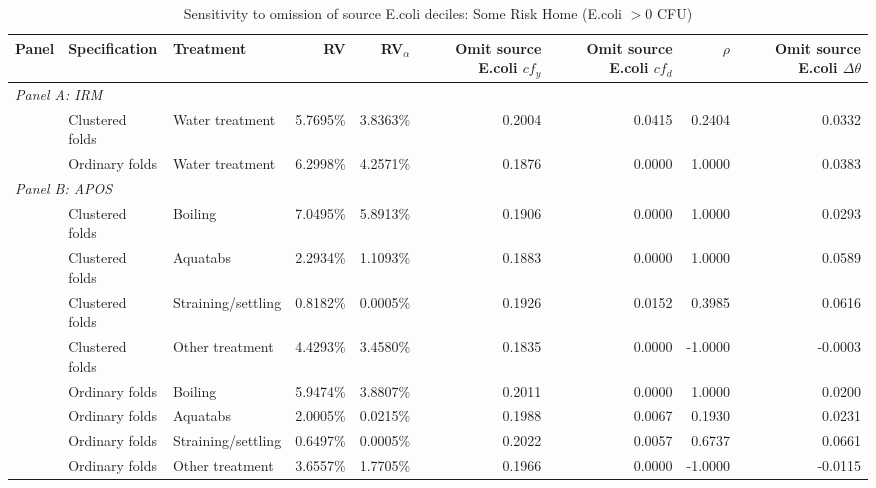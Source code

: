 \begin{landscape}
\begin{table}[p]
\centering
\caption{Sensitivity to omission of source E.coli deciles: Some Risk Home (E.coli $>0$ CFU)}
\label{tab:table_sensitivity_benchmark-SomeRiskHome}
\scriptsize
\setlength{\tabcolsep}{5pt}
\renewcommand{\arraystretch}{0.92}
\begin{adjustbox}{max width=\linewidth, center}
\begin{tabular}{lllrrrrrr}
\toprule
Panel & Specification & Treatment & RV & RV$_\alpha$ & \shortstack{Omit source E.coli\\$cf_y$} & \shortstack{Omit source E.coli\\$cf_d$} & $\rho$ & \shortstack{Omit source E.coli\\$\Delta\theta$} \\
\midrule
\multicolumn{9}{l}{\textit{Panel A: IRM}} \\
 & Clustered folds & Water treatment & 5.7695\% & 3.8363\% & 0.2004 & 0.0415 & 0.2404 & 0.0332 \\
\addlinespace[3pt]
 & Ordinary folds & Water treatment & 6.2998\% & 4.2571\% & 0.1876 & 0.0000 & 1.0000 & 0.0383 \\
\midrule
\multicolumn{9}{l}{\textit{Panel B: APOS}} \\
 & Clustered folds & Boiling & 7.0495\% & 5.8913\% & 0.1906 & 0.0000 & 1.0000 & 0.0293 \\
 & Clustered folds & Aquatabs & 2.2934\% & 1.1093\% & 0.1883 & 0.0000 & 1.0000 & 0.0589 \\
 & Clustered folds & Straining/settling & 0.8182\% & 0.0005\% & 0.1926 & 0.0152 & 0.3985 & 0.0616 \\
 & Clustered folds & Other treatment & 4.4293\% & 3.4580\% & 0.1835 & 0.0000 & -1.0000 & -0.0003 \\
\addlinespace[3pt]
 & Ordinary folds & Boiling & 5.9474\% & 3.8807\% & 0.2011 & 0.0000 & 1.0000 & 0.0200 \\
 & Ordinary folds & Aquatabs & 2.0005\% & 0.0215\% & 0.1988 & 0.0067 & 0.1930 & 0.0231 \\
 & Ordinary folds & Straining/settling & 0.6497\% & 0.0005\% & 0.2022 & 0.0057 & 0.6737 & 0.0661 \\
 & Ordinary folds & Other treatment & 3.6557\% & 1.7705\% & 0.1966 & 0.0000 & -1.0000 & -0.0115 \\
\bottomrule
\end{tabular}
\end{adjustbox}

\end{table}
\end{landscape}
